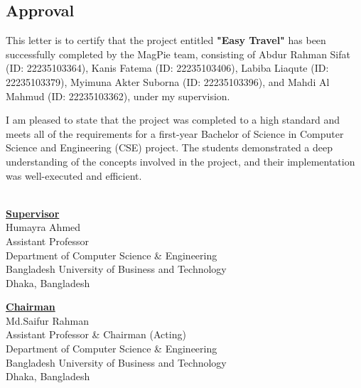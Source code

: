 

\begin{center}
    \section*{Approval}
\end{center}

\begin{FlushLeft}
    \justifying
    This letter is to certify that the project entitled \textbf{"Easy Travel"} has been successfully completed by the MagPie team, consisting of Abdur Rahman Sifat (ID: 22235103364), Kanis Fatema (ID: 22235103406), Labiba Liaqute (ID: 22235103379), Myimuna Akter Suborna (ID: 22235103396), and Mahdi Al Mahmud (ID: 22235103362), under my supervision.

    I am pleased to state that the project was completed to a high standard and meets all of the requirements for a first-year Bachelor of Science in Computer Science and Engineering (CSE) project. The students demonstrated a deep understanding of the concepts involved in the project, and their implementation was well-executed and efficient.
\end{FlushLeft}

\vspace{15mm}
\null\hfill\\
\textbf{\underline{Supervisor}} \null\hfill  \\
Humayra Ahmed \\
Assistant Professor \\
Department of Computer Science \& Engineering \\
Bangladesh University of Business and Technology\\
Dhaka, Bangladesh\\

\vspace{6mm}

\begin{FlushLeft}
\textbf{\underline{Chairman}} \null\hfill  \\
Md.Saifur Rahman \\
Assistant Professor \& Chairman (Acting)\\
Department of Computer Science \& Engineering \\
Bangladesh University of Business and Technology\\
Dhaka, Bangladesh\\
\end{FlushLeft}

